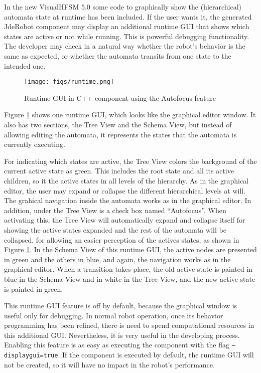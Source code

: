 \documentclass[journal,twoside]{JoPhA}
\begin{document}
In the new VisualHFSM 5.0 some code to graphically show the (hierarchical) automata state at runtime has been included. If the user wants it, the generated JdeRobot component may display an additional runtime GUI that shows which states are active or not while running. This is powerful debugging functionality. The developer may check in a natural way whether the robot’s behavior is the same as expected, or whether the automata transits from one state to the intended one.

\begin{figure}[ht!]
\begin{center}
        \texttt{[image: figs/runtime.png]}
\end{center}
\caption{Runtime GUI in C++ component using the Autofocus feature}
\label{fig:runtime}
\end{figure}

Figure \ref{fig:runtime} shows one runtime GUI, which looks like the graphical editor window. It also has two sections, the Tree View and the Schema View, but instead of allowing editing the automata, it represents the states that the automata is currently executing. 

For indicating which states are active, the Tree View colors the background of the current active state as green. This includes the root state and all its active children, so it the active states in all levels of the hierarchy. As in the graphical editor, the user may expand or collapse the different hierarchical levels at will. The grahical navigation inside the automata works as in the graphical editor. In addition, under the Tree View is a check box named “Autofocus”. When activating this, the Tree View will automatically expand and collapse itself for showing the active states expanded and the rest of the automata will be collapsed, for allowing an easier perception of the actives states, as shown in Figure \ref{fig:runtime}. In the Schema View of this runtime GUI, the active nodes are presented in green and the others in blue, and again, the navigation works as in the graphical editor. When a transition takes place, the old active state is painted in blue in the Schema View and in white in the Tree View, and the new active state is painted in green. 

This runtime GUI feature is off by default, because the graphical window is useful only for debugging. In normal robot operation, once its behavior programming has been refined, there is need to spend computational resources in this additional GUI. Nevertheless, it is very useful in the developing process. Enabling this feature is as easy as executing the component with the flag \texttt{--displaygui=true}. If the component is executed by default, the runtime GUI will not be created, so it will have no impact in the robot’s performance.
\end{document}
